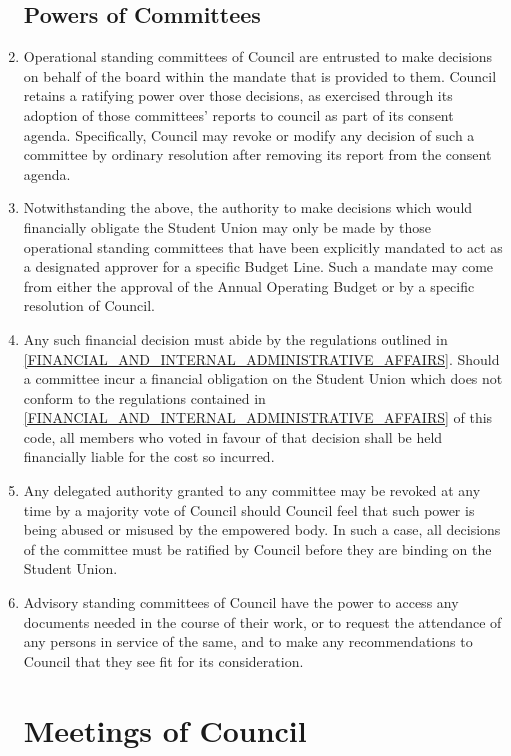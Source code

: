 \documentclass[oneside]{book}
\begin{document}
\begin{enumerate}
\section{\label{Powers_of_Committees}Powers of Committees}

\item Operational standing committees of Council are entrusted to make decisions on behalf of the board within the mandate that is provided to them. Council retains a ratifying power over those decisions, as exercised through its adoption of those committees’ reports to council as part of its consent agenda. Specifically, Council may revoke or modify any decision of such a committee by ordinary resolution after removing its report from the consent agenda.
\item Notwithstanding the above, the authority to make decisions which would financially obligate the Student Union may only be made by those operational standing committees that have been explicitly mandated to act as a designated approver for a specific Budget Line. Such a mandate may come from either the approval of the Annual Operating Budget or by a specific resolution of Council.
\item Any such financial decision must abide by the regulations outlined in \autoref{FINANCIAL_AND_INTERNAL_ADMINISTRATIVE_AFFAIRS}. Should a committee incur a financial obligation on the Student Union which does not conform to the regulations contained in \autoref{FINANCIAL_AND_INTERNAL_ADMINISTRATIVE_AFFAIRS} of this code, all members who voted in favour of that decision shall be held financially liable for the cost so incurred.
\item Any delegated authority granted to any committee may be revoked at any time by a majority vote of Council should Council feel that such power is being abused or misused by the empowered body. In such a case, all decisions of the committee must be ratified by Council before they are binding on the Student Union. 
\item Advisory standing committees of Council have the power to access any documents needed in the course of their work, or to request the attendance of any persons in service of the same, and to make any recommendations to Council that they see fit for its consideration. 

\chapter{\label{Meetings_of_Council}Meetings of Council }

\end{enumerate}
\end{document}
